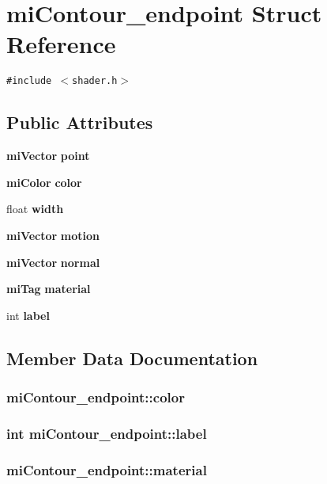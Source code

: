 \section{mi\-Contour\_\-endpoint Struct Reference}
\label{structmiContour__endpoint}
{\tt \#include $<$shader.h$>$}

\subsection*{Public Attributes}
\begin{CompactItemize}
\item 
{\bf mi\-Vector} {\bf point}
\item 
{\bf mi\-Color} {\bf color}
\item 
float {\bf width}
\item 
{\bf mi\-Vector} {\bf motion}
\item 
{\bf mi\-Vector} {\bf normal}
\item 
{\bf mi\-Tag} {\bf material}
\item 
int {\bf label}
\end{CompactItemize}


\subsection{Member Data Documentation}
\subsubsection{ {\bf mi\-Contour\_\-endpoint::color}}\label{structmiContour__endpoint_o1}


\subsubsection{\setlength{\rightskip}{0pt plus 5cm}int {\bf mi\-Contour\_\-endpoint::label}}\label{structmiContour__endpoint_o6}


\subsubsection{ {\bf mi\-Contour\_\-endpoint::material}}\label{structmiContour__endpoint_o5}


